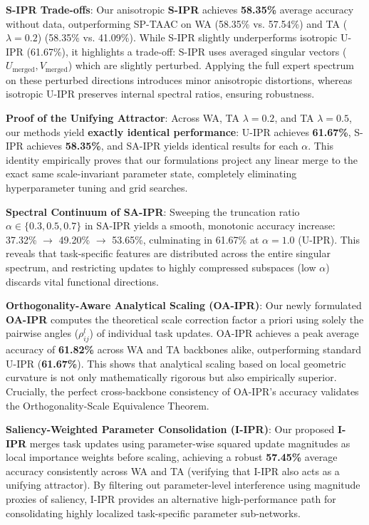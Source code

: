 \documentclass{article}
\begin{document}
\textbf{S-IPR Trade-offs}: Our anisotropic \textbf{S-IPR} achieves \textbf{58.35\%} average accuracy without data, outperforming SP-TAAC on WA (58.35\% vs. 57.54\%) and TA ($\lambda=0.2$) (58.35\% vs. 41.09\%). While S-IPR slightly underperforms isotropic U-IPR (61.67\%), it highlights a trade-off: S-IPR uses averaged singular vectors ($U_{\text{merged}}, V_{\text{merged}}$) which are slightly perturbed. Applying the full expert spectrum on these perturbed directions introduces minor anisotropic distortions, whereas isotropic U-IPR preserves internal spectral ratios, ensuring robustness.

\textbf{Proof of the Unifying Attractor}: Across WA, TA $\lambda=0.2$, and TA $\lambda=0.5$, our methods yield \textbf{exactly identical performance}: U-IPR achieves \textbf{61.67\%}, S-IPR achieves \textbf{58.35\%}, and SA-IPR yields identical results for each $\alpha$. This identity empirically proves that our formulations project any linear merge to the exact same scale-invariant parameter state, completely eliminating hyperparameter tuning and grid searches.

\textbf{Spectral Continuum of SA-IPR}: Sweeping the truncation ratio $\alpha \in \{0.3, 0.5, 0.7\}$ in SA-IPR yields a smooth, monotonic accuracy increase: 37.32\% $\to$ 49.20\% $\to$ 53.65\%, culminating in 61.67\% at $\alpha=1.0$ (U-IPR). This reveals that task-specific features are distributed across the entire singular spectrum, and restricting updates to highly compressed subspaces (low $\alpha$) discards vital functional directions.

\textbf{Orthogonality-Aware Analytical Scaling (OA-IPR)}: Our newly formulated \textbf{OA-IPR} computes the theoretical scale correction factor a priori using solely the pairwise angles ($\rho_{ij}^l$) of individual task updates. OA-IPR achieves a peak average accuracy of \textbf{61.82\%} across WA and TA backbones alike, outperforming standard U-IPR (\textbf{61.67\%}). This shows that analytical scaling based on local geometric curvature is not only mathematically rigorous but also empirically superior. Crucially, the perfect cross-backbone consistency of OA-IPR's accuracy validates the Orthogonality-Scale Equivalence Theorem.

\textbf{Saliency-Weighted Parameter Consolidation (I-IPR)}: Our proposed \textbf{I-IPR} merges task updates using parameter-wise squared update magnitudes as local importance weights before scaling, achieving a robust \textbf{57.45\%} average accuracy consistently across WA and TA (verifying that I-IPR also acts as a unifying attractor). By filtering out parameter-level interference using magnitude proxies of saliency, I-IPR provides an alternative high-performance path for consolidating highly localized task-specific parameter sub-networks.
\end{document}
